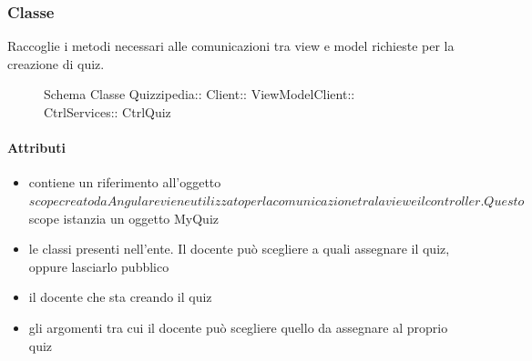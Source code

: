 \subsubsection{Classe }
Raccoglie i metodi necessari alle comunicazioni tra view e model richieste per la creazione di quiz.
\begin{figure}[H]
\centering
\noindent{}
\caption[Schema Classe CtrlQuiz]{Schema Classe Quizzipedia:: Client:: ViewModelClient:: CtrlServices:: CtrlQuiz}
\end{figure}
\paragraph{Attributi}
\begin{itemize}
\item {}
\newline
contiene un riferimento all'oggetto $scope creato da Angular e viene utilizzato per la comunicazione tra la view e il controller. Questo $scope istanzia un oggetto MyQuiz
\item {}
\newline
le classi presenti nell'ente. Il docente può scegliere a quali assegnare il quiz, oppure lasciarlo pubblico
\item {}
\newline
il docente che sta creando il quiz
\item {}
\newline
gli argomenti tra cui il docente può scegliere quello da assegnare al proprio quiz
\end{itemize}
